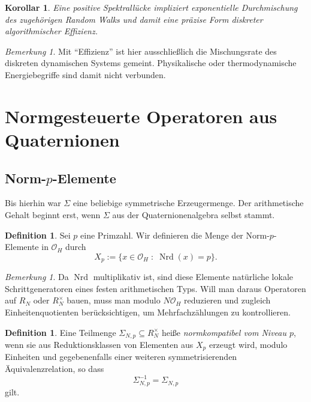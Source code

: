 \documentclass[12pt,a4paper]{article}
\theoremstyle{plain}
\newtheorem{korollar}[satz]{Korollar}
\theoremstyle{definition}
\newtheorem{definition}[satz]{Definition}
\theoremstyle{remark}
\newtheorem{bemerkung}[satz]{Bemerkung}
\newcommand{\OH}{\mathcal{O}_H}
\newcommand{\Nrd}{\operatorname{Nrd}}
\begin{document}
	\begin{korollar}
		Eine positive Spektrallücke impliziert exponentielle Durchmischung des
		zugehörigen Random Walks und damit eine präzise Form diskreter
		algorithmischer Effizienz.
	\end{korollar}
	
	\begin{bemerkung}
		Mit \enquote{Effizienz} ist hier ausschließlich die Mischungsrate des
		diskreten dynamischen Systems gemeint.
		Physikalische oder thermodynamische Energiebegriffe sind damit
		nicht verbunden.
	\end{bemerkung}
	
	\section{Normgesteuerte Operatoren aus Quaternionen}
	
	\subsection{Norm-\texorpdfstring{$p$}{p}-Elemente}
	
	Bis hierhin war \(\Sigma\) eine beliebige symmetrische Erzeugermenge.
	Der arithmetische Gehalt beginnt erst, wenn \(\Sigma\) aus der Quaternionenalgebra
	selbst stammt.
	
	\begin{definition}
		Sei \(p\) eine Primzahl.
		Wir definieren die Menge der Norm-\(p\)-Elemente in \(\OH\) durch
		\[
		X_p := \{x\in \OH \;:\; \Nrd(x)=p\}.
		\]
	\end{definition}
	
	\begin{bemerkung}
		Da \(\Nrd\) multiplikativ ist, sind diese Elemente natürliche
		lokale Schrittgeneratoren eines festen arithmetischen Typs.
		Will man daraus Operatoren auf \(R_N\) oder \(R_N^\times\) bauen,
		muss man modulo \(N\OH\) reduzieren und zugleich Einheitenquotienten
		berücksichtigen, um Mehrfachzählungen zu kontrollieren.
	\end{bemerkung}
	
	\begin{definition}
		Eine Teilmenge \(\Sigma_{N,p}\subseteq R_N^\times\) heiße
		\emph{normkompatibel vom Niveau \(p\)}, wenn sie aus Reduktionsklassen
		von Elementen aus \(X_p\) erzeugt wird, modulo Einheiten und gegebenenfalls
		einer weiteren symmetrisierenden Äquivalenzrelation, so dass
		\[
		\Sigma_{N,p}^{-1}=\Sigma_{N,p}
		\]
		gilt.
	\end{definition}
	
\end{document}
